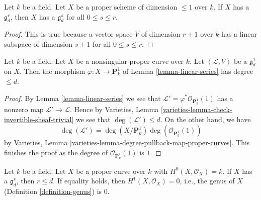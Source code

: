 \begin{lemma}
\label{lemma-linear-series-trivial-existence}
Let $k$ be a field. Let $X$ be a proper scheme of dimension $\leq 1$ over $k$.
If $X$ has a $\mathfrak g^r_d$, then $X$ has a $\mathfrak g^s_d$ for
all $0 \leq s \leq r$.
\end{lemma}

\begin{proof}
This is true because a vector space $V$ of dimension $r + 1$
over $k$ has a linear subspace of dimension $s + 1$ for all
$0 \leq s \leq r$.
\end{proof}

\begin{lemma}
\label{lemma-g1d}
Let $k$ be a field. Let $X$ be a nonsingular proper curve over $k$.
Let $(\mathcal{L}, V)$ be a $\mathfrak g^1_d$ on $X$. Then the morphism
$\varphi : X \to \mathbf{P}^1_k$ of Lemma \ref{lemma-linear-series}
has degree $\leq d$.
\end{lemma}

\begin{proof}
By Lemma \ref{lemma-linear-series} we see that
$\mathcal{L}' = \varphi^*\mathcal{O}_{\mathbf{P}^1_k}(1)$
has a nonzero map $\mathcal{L}' \to \mathcal{L}$.
Hence by Varieties, Lemma \ref{varieties-lemma-check-invertible-sheaf-trivial}
we see that $\deg(\mathcal{L}') \leq d$.
On the other hand, we have
$$
\deg(\mathcal{L}') =
\deg(X/\mathbf{P}^1_k) \deg(\mathcal{O}_{\mathbf{P}^1_k}(1))
$$
by Varieties, Lemma \ref{varieties-lemma-degree-pullback-map-proper-curves}.
This finishes the proof as the degree of
$\mathcal{O}_{\mathbf{P}^1_k}(1)$ is $1$.
\end{proof}

\begin{lemma}
\label{lemma-grd-inequalities}
Let $k$ be a field. Let $X$ be a proper curve over $k$ with
$H^0(X, \mathcal{O}_X) = k$. If $X$ has a $\mathfrak g^r_d$, then
$r \leq d$. If equality holds, then $H^1(X, \mathcal{O}_X) = 0$, i.e.,
the genus of $X$ (Definition \ref{definition-genus}) is $0$.
\end{lemma}

